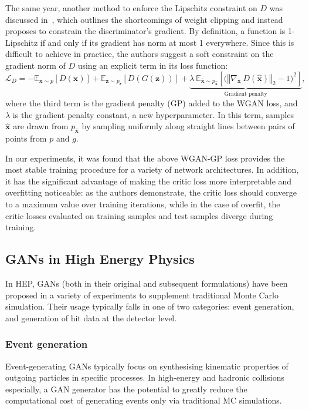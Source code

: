 The same year, another method to enforce the Lipschitz constraint on $D$ was discussed in~\cite{NIPS2017_892c3b1c}, which outlines the shortcomings of weight clipping and instead proposes to constrain the discriminator's gradient.
By definition, a function is 1-Lipschitz if and only if its gradient has norm at most 1 everywhere. Since this is difficult to achieve in practice, the authors suggest a soft constraint on the gradient norm of $D$ using an explicit term in its loss function:
\begin{equation}\label{eq:WGAN-GP}
    \mathcal{L}_D = 
        -\mathbb{E}_{\mathbf{x} \sim p} \left[ D(\mathbf{x}) \right] +
        \mathbb{E}_{\mathbf{z} \sim p_\mathbf{z}} \left[ D(G(\mathbf{z})) \right] +
        \underbrace{\lambda\ \mathbb{E}_{\hat{\mathbf{x}} \sim p_{\hat{\mathbf{x}}}}
            \left[ \big( \left\Vert \nabla_{\hat{\mathbf{x}}}\ D(\hat{\mathbf{x}}) \right\Vert_2 - 1 \big) ^2 \right]}_\textrm{Gradient penalty},
\end{equation}
where the third term is the gradient penalty (GP) added to the WGAN loss, and $\lambda$ is the gradient penalty constant, a new hyperparameter. In this term, samples $\hat{\mathbf{x}}$ are drawn from $p_{\hat{\mathbf{x}}}$ by sampling uniformly along straight lines between pairs of points from $p$ and $g$. 

In our experiments, it was found that the above WGAN-GP loss provides the most stable training procedure for a variety of network architectures. In addition, it has the significant advantage of making the critic loss more interpretable and overfitting noticeable: as the authors demonstrate, the critic loss should converge to a maximum value over training iterations, while in the case of overfit, the critic losses evaluated on training samples and test samples diverge during training.

\subsection{GANs in High Energy Physics}
In HEP, GANs (both in their original and subsequent formulations) have been proposed in a variety of experiments to supplement traditional Monte Carlo simulation. Their usage typically falls in one of two categories: event generation, and generation of hit data at the detector level.

\subsubsection{Event generation}
Event-generating GANs typically focus on synthesising kinematic properties of outgoing particles in specific processes. In high-energy and hadronic collisions especially, a GAN generator has the potential to greatly reduce the computational cost of generating events only via traditional MC simulations.


